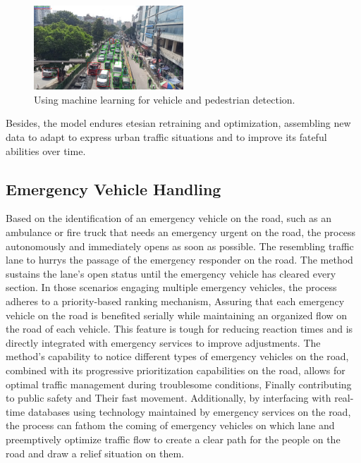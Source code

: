 \documentclass[usenatbib]{tjaa}
\begin{document}
\begin{figure}
    \centering
    \includegraphics[width=0.5\textwidth]{8.png} %
    \caption{Using machine learning for vehicle and pedestrian detection.}
    \label{fig:f2}
\end{figure}

Besides, the model endures etesian retraining and optimization, assembling new data to adapt to express urban traffic situations and to improve its fateful abilities over time.

\subsection{Emergency Vehicle Handling}

Based on the identification of an emergency vehicle on the road, such as an ambulance or fire truck that needs an emergency urgent on the road, the process autonomously and immediately opens as soon as possible. The resembling traffic lane to hurrys the passage of the emergency responder on the road. The method sustains the lane’s open status until the emergency vehicle has cleared every section. In those scenarios engaging multiple emergency vehicles, the process adheres to a priority-based ranking mechanism,
Assuring that each emergency vehicle on the road is benefited serially while maintaining an organized flow on the road of each vehicle. This feature is tough for reducing reaction times and is directly integrated with emergency services to improve adjustments. The method’s capability to notice different types of emergency vehicles on the road, combined with its progressive prioritization capabilities on the road, allows for optimal traffic management during troublesome conditions, Finally contributing to public safety and Their fast movement.  Additionally, by interfacing with real-time databases using technology maintained by emergency services on the road, the process can fathom the coming of emergency vehicles on which lane and preemptively optimize traffic flow to create a clear path for the people on the road and draw a relief situation on them.
\end{document}
